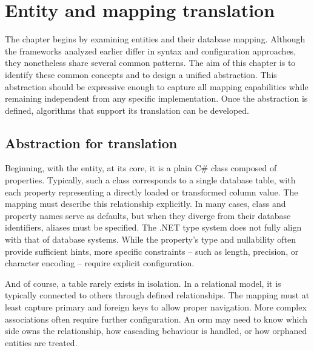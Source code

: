 \chapter{Entity and mapping translation}\label{chapter:entity_translation}

The chapter begins by examining entities and their database mapping. Although the frameworks analyzed earlier differ in syntax and configuration approaches, they nonetheless share several common patterns. The aim of this chapter is to identify these common concepts and to design a unified abstraction. This abstraction should be expressive enough to capture all mapping capabilities while remaining independent from any specific implementation. Once the abstraction is defined, algorithms that support its translation can be developed.

\section{Abstraction for translation}\label{sec:def_abstract}

Beginning, with the entity, at its core, it is a plain C\# class composed of properties. Typically, such a class corresponds to a single database table, with each property representing a directly loaded or transformed column value. The mapping must describe this relationship explicitly. In many cases, class and property names serve as defaults, but when they diverge from their database identifiers, aliases must be specified. The .NET type system does not fully align with that of database systems. While the property's type and nullability often provide sufficient hints, more specific constraints -- such as length, precision, or character encoding -- require explicit configuration.

And of course, a table rarely exists in isolation. In a relational model, it is typically connected to others through defined relationships. The mapping must at least capture primary and foreign keys to allow proper navigation. More complex associations often require further configuration. An \acrshort{orm} may need to know which side owns the relationship, how cascading behaviour is handled, or how orphaned entities are treated.

